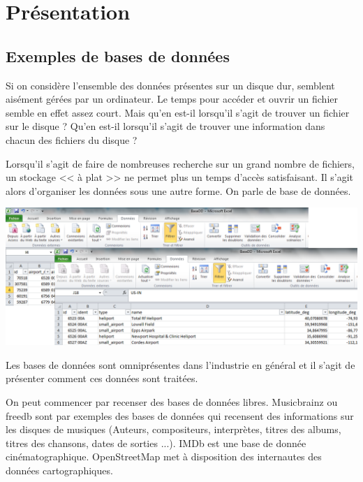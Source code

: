 \documentclass[10pt,fleqn]{article} %
\begin{document}


\section{Présentation}
\subsection{Exemples de bases de données}
Si on considère l'ensemble des données présentes sur un disque dur, semblent aisément gérées par un ordinateur. Le temps pour accéder et ouvrir un fichier semble en effet assez court. Mais qu'en est-il lorsqu'il s'agit de trouver un fichier sur le disque ? Qu'en est-il lorsqu'il s'agit de trouver une information dans chacun des fichiers du disque ?

\begin{minipage}[c]{.49\linewidth}
Lorsqu'il s'agit de faire de nombreuses recherche sur un grand nombre de fichiers, un stockage << à plat >> ne permet plus un temps d'accès satisfaisant. Il s'agit alors d'organiser les données sous une autre forme. On parle de base de données. 
\end{minipage} \hfill
\begin{minipage}[c]{.49\linewidth}
\includegraphics[width=.95\textwidth]{images/BDD_aplat}
\end{minipage}

Les bases de données sont omniprésentes dans l'industrie en général et il s'agit de présenter comment ces données sont traitées. 

On peut commencer par recenser des bases de données libres. Musicbrainz ou freedb sont par exemples des bases de données qui recensent des informations sur les disques de musiques (Auteurs, compositeurs, interprètes, titres des albums, titres des chansons, dates de sorties ...). IMDb est une base de donnée cinématographique. OpenStreetMap met à disposition des internautes des données cartographiques. 
\end{document}
